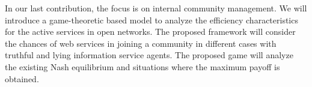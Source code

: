 In our last contribution, the focus is on internal community management. We will introduce a game-theoretic based model to analyze the efficiency characteristics for the active services in open networks. The proposed framework will consider the chances of web services in joining a community in different cases with truthful and lying information service agents. The proposed game will analyze the existing Nash equilibrium and situations where the maximum payoff is obtained.
